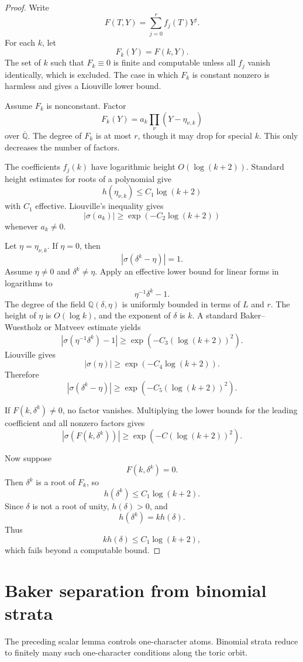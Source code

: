 \documentclass[11pt]{article}
\newcommand{\Q}{\mathbb Q}
\begin{document}
\begin{proof}
Write
\[
F(T,Y)=\sum_{j=0}^r f_j(T)Y^j.
\]
For each \(k\), let
\[
F_k(Y)=F(k,Y).
\]
The set of \(k\) such that \(F_k\equiv0\) is finite and computable unless all \(f_j\) vanish identically, which is excluded. The case in which \(F_k\) is constant nonzero is harmless and gives a Liouville lower bound.

Assume \(F_k\) is nonconstant. Factor
\[
F_k(Y)=a_k\prod_\nu(Y-\eta_{\nu,k})
\]
over \(\overline{\Q}\). The degree of \(F_k\) is at most \(r\), though it may drop for special \(k\). This only decreases the number of factors.

The coefficients \(f_j(k)\) have logarithmic height \(O(\log(k+2))\). Standard height estimates for roots of a polynomial give
\[
h(\eta_{\nu,k})\le C_1\log(k+2)
\]
with \(C_1\) effective. Liouville's inequality gives
\[
|\sigma(a_k)|\ge\exp(-C_2\log(k+2))
\]
whenever \(a_k\ne0\).

Let \(\eta=\eta_{\nu,k}\). If \(\eta=0\), then
\[
|\sigma(\delta^k-\eta)|=1.
\]
Assume \(\eta\ne0\) and \(\delta^k\ne\eta\). Apply an effective lower bound for linear forms in logarithms to
\[
\eta^{-1}\delta^k-1.
\]
The degree of the field \(\Q(\delta,\eta)\) is uniformly bounded in terms of \(L\) and \(r\). The height of \(\eta\) is \(O(\log k)\), and the exponent of \(\delta\) is \(k\). A standard Baker--Wuestholz or Matveev estimate yields
\[
|\sigma(\eta^{-1}\delta^k)-1|
\ge
\exp(-C_3(\log(k+2))^2).
\]
Liouville gives
\[
|\sigma(\eta)|\ge\exp(-C_4\log(k+2)).
\]
Therefore
\[
|\sigma(\delta^k-\eta)|
\ge
\exp(-C_5(\log(k+2))^2).
\]

If \(F(k,\delta^k)\ne0\), no factor vanishes. Multiplying the lower bounds for the leading coefficient and all nonzero factors gives
\[
|\sigma(F(k,\delta^k))|
\ge
\exp(-C(\log(k+2))^2).
\]

Now suppose
\[
F(k,\delta^k)=0.
\]
Then \(\delta^k\) is a root of \(F_k\), so
\[
h(\delta^k)\le C_1\log(k+2).
\]
Since \(\delta\) is not a root of unity, \(h(\delta)>0\), and
\[
h(\delta^k)=k h(\delta).
\]
Thus
\[
k h(\delta)\le C_1\log(k+2),
\]
which fails beyond a computable bound.
\end{proof}

\section{Baker separation from binomial strata}

The preceding scalar lemma controls one-character atoms. Binomial strata reduce to finitely many such one-character conditions along the toric orbit.
\end{document}
